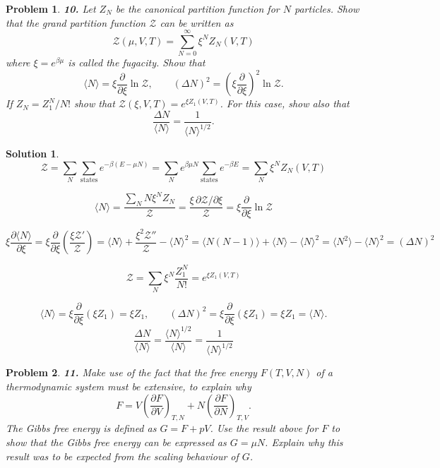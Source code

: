 \documentclass[11pt]{article}
\newtheorem*{problem}{Problem}
\newtheorem*{solution}{Solution}
\begin{document}
\begin{problem}
\textbf{10.} Let $Z_N$ be the canonical partition function for $N$ particles. Show that the
grand partition function $\mathcal{Z}$ can be written as
\[
\mathcal{Z}(\mu,V,T)=\sum_{N=0}^\infty\xi^NZ_N(V,T)
\]
where $\xi=e^{\beta\mu}$ is called the \textit{fugacity}. Show that
\[
\langle N\rangle=\xi\frac{\partial}{\partial\xi}\ln\mathcal{Z},
\qquad
(\Delta N)^2=\left(\xi\frac{\partial}{\partial\xi}\right)^2\ln\mathcal{Z}.
\]
If $Z_N=Z_1^N/N!$ show that $\mathcal{Z}(\xi,V,T)=e^{\xi Z_1(V,T)}$. For this case, show also
that
\[
\frac{\Delta N}{\langle N\rangle}=\frac{1}{\langle N\rangle^{1/2}}.
\]
\end{problem}

\begin{solution}
\[
\mathcal{Z}=\sum_N\sum_{\text{states}}e^{-\beta(E-\mu N)}
=\sum_Ne^{\beta\mu N}\sum_{\text{states}}e^{-\beta E}
=\boxed{\sum_N\xi^NZ_N(V,T)}
\]

\[
\langle N\rangle=\frac{\sum_NN\xi^NZ_N}{\mathcal{Z}}=\frac{\xi\,\partial\mathcal{Z}/\partial\xi}{\mathcal{Z}}
=\boxed{\xi\frac{\partial}{\partial\xi}\ln\mathcal{Z}}
\]

\[
\xi\frac{\partial\langle N\rangle}{\partial\xi}
=\xi\frac{\partial}{\partial\xi}\!\left(\frac{\xi\mathcal{Z}'}{\mathcal{Z}}\right)
=\langle N\rangle+\frac{\xi^2\mathcal{Z}''}{\mathcal{Z}}-\langle N\rangle^2
=\langle N(N-1)\rangle+\langle N\rangle-\langle N\rangle^2
=\boxed{\langle N^2\rangle-\langle N\rangle^2=(\Delta N)^2}
\]

\[
\mathcal{Z}=\sum_N\xi^N\frac{Z_1^N}{N!}=\boxed{e^{\xi Z_1(V,T)}}
\]

\[
\langle N\rangle=\xi\frac{\partial}{\partial\xi}(\xi Z_1)=\xi Z_1,
\qquad
(\Delta N)^2=\xi\frac{\partial}{\partial\xi}(\xi Z_1)=\xi Z_1=\langle N\rangle.
\]
\[
\boxed{\frac{\Delta N}{\langle N\rangle}=\frac{\langle N\rangle^{1/2}}{\langle N\rangle}=\frac{1}{\langle N\rangle^{1/2}}}
\]
\end{solution}

\begin{problem}
\textbf{11.} Make use of the fact that the free energy $F(T,V,N)$ of a thermodynamic system
must be extensive, to explain why
\[
F=V\left(\frac{\partial F}{\partial V}\right)_{T,N}+N\left(\frac{\partial F}{\partial N}\right)_{T,V}.
\]
The \textit{Gibbs free energy} is defined as $G=F+pV$. Use the result above for $F$ to show
that the Gibbs free energy can be expressed as $G=\mu N$. Explain why this result was to be
expected from the scaling behaviour of $G$.
\end{problem}
\end{document}
